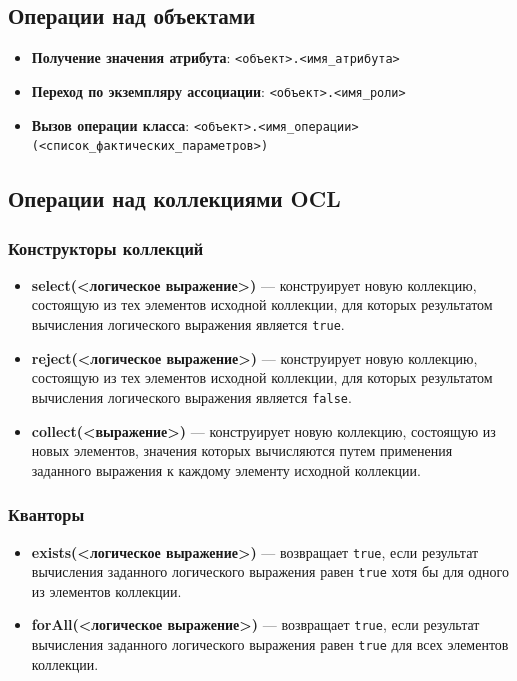 \documentclass[a4paper,12pt]{article}
\begin{document}
\subsection{Операции над объектами}

\begin{itemize}
    \item \textbf{Получение значения атрибута}: \texttt{<объект>.<имя\_атрибута>}
    \item \textbf{Переход по экземпляру ассоциации}: \texttt{<объект>.<имя\_роли>}
    \item \textbf{Вызов операции класса}: \texttt{<объект>.<имя\_операции>(<список\_фактических\_параметров>)}
\end{itemize}

\subsection{Операции над коллекциями OCL}

\subsubsection{Конструкторы коллекций}

\begin{itemize}
    \item \textbf{select(<логическое выражение>)} — конструирует новую коллекцию, состоящую из тех элементов исходной коллекции, для которых результатом вычисления логического выражения является \texttt{true}.
    \item \textbf{reject(<логическое выражение>)} — конструирует новую коллекцию, состоящую из тех элементов исходной коллекции, для которых результатом вычисления логического выражения является \texttt{false}.
    \item \textbf{collect(<выражение>)} — конструирует новую коллекцию, состоящую из новых элементов, значения которых вычисляются путем применения заданного выражения к каждому элементу исходной коллекции.
\end{itemize}

\subsubsection{Кванторы}

\begin{itemize}
    \item \textbf{exists(<логическое выражение>)} — возвращает \texttt{true}, если результат вычисления заданного логического выражения равен \texttt{true} хотя бы для одного из элементов коллекции.
    \item \textbf{forAll(<логическое выражение>)} — возвращает \texttt{true}, если результат вычисления заданного логического выражения равен \texttt{true} для всех элементов коллекции.
\end{itemize}
\end{document}
